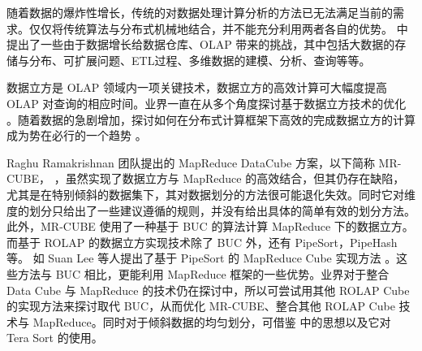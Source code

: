 随着数据的爆炸性增长，传统的对数据处理计算分析的方法已无法满足当前的需求。仅仅将传统算法与分布式机械地结合，并不能充分利用两者各自的优势。\cite{cuzzocrea2011analytics} \cite{cuzzocrea2013data} \cite{cuzzocrea2013big} 中提出了一些由于数据增长给数据仓库、OLAP 带来的挑战，其中包括大数据的存储与分布、可扩展问题、ETL过程、多维数据的建模、分析、查询等等。

数据立方是 OLAP 领域内一项关键技术，数据立方的高效计算可大幅度提高 OLAP 对查询的相应时间。业界一直在从多个角度探讨基于数据立方技术的优化 \cite{xin2003star} \cite{harinarayan1996implementing} \cite{zhao1997array} \cite{han2001efficient} \cite{wang2002condensed}。随着数据的急剧增加，探讨如何在分布式计算框架下高效的完成数据立方的计算成为势在必行的一个趋势 \cite{abello2011building} \cite{wang2010mapreducemerge} \cite{sergey2009applying} \cite{lee2012efficient} \cite{wang2013scalable}。

Raghu Ramakrishnan 团队提出的 MapReduce DataCube 方案，以下简称 MR-CUBE， \cite{nandi2012data} \cite{nandi2011distributed}，虽然实现了数据立方与 MapReduce 的高效结合，但其仍存在缺陷，尤其是在特别倾斜的数据集下，其对数据划分的方法很可能退化失效。同时它对维度的划分只给出了一些建议遵循的规则，并没有给出具体的简单有效的划分方法。此外，MR-CUBE 使用了一种基于 BUC \cite{beyer1999bottom} 的算法计算 MapReduce 下的数据立方。而基于 ROLAP 的数据立方实现技术除了 BUC 外，还有 PipeSort，PipeHash \cite{agarwal1996computation} 等。 如 Suan Lee 等人提出了基于 PipeSort 的 MapReduce Cube 实现方法 \cite{lee2012efficient} 。这些方法与 BUC 相比，更能利用 MapReduce 框架的一些优势。业界对于整合 Data Cube 与 MapReduce 的技术仍在探讨中，所以可尝试用其他 ROLAP Cube 的实现方法来探讨取代 BUC，从而优化 MR-CUBE、整合其他 ROLAP Cube 技术与 MapReduce。同时对于倾斜数据的均匀划分，可借鉴 \cite{tao2013minimal} 中的思想以及它对 Tera Sort 的使用。
